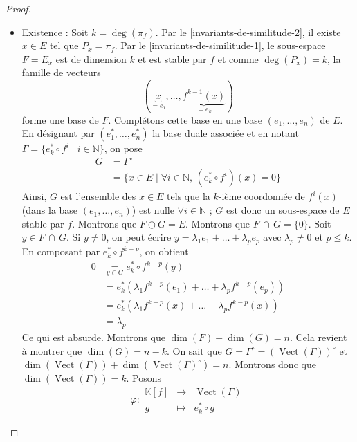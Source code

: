   \begin{proof}
    \begin{itemize}
      \item \uline{Existence :} Soit $k = \deg(\pi_f)$. Par le \cref{invariants-de-similitude-2}, il existe $x \in E$ tel que $P_x = \pi_f$. Par le \cref{invariants-de-similitude-1}, le sous-espace $F = E_x$ est de dimension $k$ et est stable par $f$ et comme $\deg(P_x) = k$, la famille de vecteurs
      \[ (\underbrace{x}_{= e_1}, \dots, \underbrace{f^{k-1}(x)}_{= e_k}) \]
      forme une base de $F$. Complétons cette base en une base $(e_1, \dots, e_n)$ de $E$. En désignant par $(e_1^*, \dots, e_n^*)$ la base duale associée et en notant $\Gamma = \{ e_k^* \circ f^i \mid i \in \mathbb{N} \}$, on pose
      \begin{align*}
        G &= \Gamma^\circ \\
        &= \{ x \in E \mid \forall i \in \mathbb{N}, \, (e_k^* \circ f^i)(x) = 0 \}
      \end{align*}
      Ainsi, $G$ est l'ensemble des $x \in E$ tels que la $k$-ième coordonnée de $f^i(x)$ (dans la base $(e_1, \dots, e_n)$) est nulle $\forall i \in \mathbb{N}$ ; $G$ est donc un sous-espace de $E$ stable par $f$. Montrons que $F \oplus G = E$.
      \newpar
      Montrons que $F \, \cap \, G = \{ 0 \}$. Soit $y \in F \, \cap \, G$. Si $y \neq 0$, on peut écrire $y = \lambda_1 e_1 + \dots + \lambda_p e_p$ avec $\lambda_p \neq 0$ et $p \leq k$. En composant par $e_k^* \circ f^{k-p}$, on obtient
      \begin{align*}
        0 &\underset{y \in G}{=} e_k^* \circ f^{k-p}(y) \\
        &= e_k^* (\lambda_1 f^{k-p}(e_1) + \dots + \lambda_p f^{k-p}(e_p)) \\
        &= e_k^* (\lambda_1 f^{k-p}(x) + \dots + \lambda_p f^{k-p}(x)) \\
        &= \lambda_p
      \end{align*}
      Ce qui est absurde.
      \newpar
      Montrons que $\dim(F) + \dim(G) = n$. Cela revient à montrer que $\dim(G) = n - k$. On sait que $G = \Gamma^\circ = (\operatorname{Vect}(\Gamma))^\circ$ et $\dim(\operatorname{Vect}(\Gamma)) + \dim(\operatorname{Vect}(\Gamma)^\circ) = n$. Montrons donc que $\dim(\operatorname{Vect}(\Gamma)) = k$. Posons
      \[
      \varphi :
      \begin{array}{ccc}
        \mathbb{K}[f] &\rightarrow& \operatorname{Vect}(\Gamma) \\
        g &\mapsto& e_k^* \circ g
      \end{array}
\]
\end{itemize}
\end{proof}
